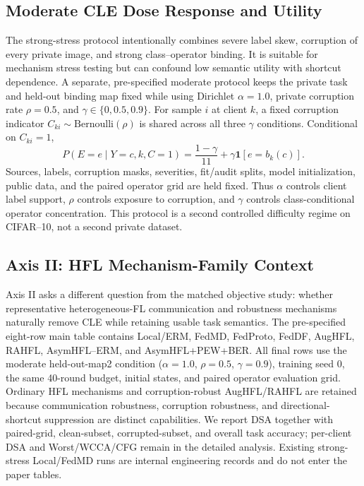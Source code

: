 
\subsection{Moderate CLE Dose Response and Utility}

The strong-stress protocol intentionally combines severe label skew, corruption of every private image, and strong class--operator binding. It is suitable for mechanism stress testing but can confound low semantic utility with shortcut dependence. A separate, pre-specified moderate protocol keeps the private task and held-out binding map fixed while using Dirichlet $\alpha=1.0$, private corruption rate $\rho=0.5$, and $\gamma\in\{0,0.5,0.9\}$. For sample $i$ at client $k$, a fixed corruption indicator $C_{ki}\sim\mathrm{Bernoulli}(\rho)$ is shared across all three $\gamma$ conditions. Conditional on $C_{ki}=1$,
\[
P(E=e\mid Y=c,k,C=1)=\frac{1-\gamma}{11}+\gamma\mathbf{1}[e=b_k(c)].
\]
Sources, labels, corruption masks, severities, fit/audit splits, model initialization, public data, and the paired operator grid are held fixed. Thus $\alpha$ controls client label support, $\rho$ controls exposure to corruption, and $\gamma$ controls class-conditional operator concentration. This protocol is a second controlled difficulty regime on CIFAR--10, not a second private dataset.




\subsection{Axis II: HFL Mechanism-Family Context}

Axis II asks a different question from the matched objective study: whether representative heterogeneous-FL communication and robustness mechanisms naturally remove CLE while retaining usable task semantics. The pre-specified eight-row main table contains Local/ERM, FedMD, FedProto, FedDF, AugHFL, RAHFL, AsymHFL--ERM, and AsymHFL+PEW+BER. All final rows use the moderate held-out-map2 condition ($\alpha=1.0$, $\rho=0.5$, $\gamma=0.9$), training seed 0, the same 40-round budget, initial states, and paired operator evaluation grid. Ordinary HFL mechanisms and corruption-robust AugHFL/RAHFL are retained because communication robustness, corruption robustness, and directional-shortcut suppression are distinct capabilities. We report DSA together with paired-grid, clean-subset, corrupted-subset, and overall task accuracy; per-client DSA and Worst/WCCA/CFG remain in the detailed analysis. Existing strong-stress Local/FedMD runs are internal engineering records and do not enter the paper tables.

